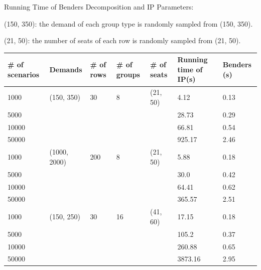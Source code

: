 \begin{frame}{Running Time of Benders Decomposition and IP}
  Parameters: 

  (150, 350): the demand of each group type is randomly sampled from (150, 350).

  (21, 50): the number of seats of each row is randomly sampled from (21, 50).
  \tiny
  \begin{table}[ht]
    \centering
    \begin{tabular}{|l|l|l|l|l|l|l|}
    \hline
    \# of scenarios & Demands & \# of rows & \# of groups & \# of seats & Running time of IP(s) & Benders (s) \\
    \hline
    1000  & (150, 350) & 30 & 8 & (21, 50) & 4.12  & 0.13 \\
    5000  &            &    &   &         & 28.73 & 0.29  \\
    10000 &            &    &   &         & 66.81  & 0.54 \\
    50000 &            &    &   &         & 925.17 & 2.46 \\
    \hline
    1000  & (1000, 2000) & 200 & 8 & (21, 50) & 5.88 & 0.18 \\
    5000  &              &     &   &          & 30.0 & 0.42 \\
    10000 &              &     &   &          & 64.41 & 0.62 \\
    50000 &              &     &   &          & 365.57 & 2.51\\
    \hline
    1000  & (150, 250) & 30 & 16 & (41, 60) & 17.15  & 0.18 \\
    5000  &            &    &    &          & 105.2  & 0.37 \\
    10000 &            &    &    &          & 260.88 & 0.65 \\
    50000 &            &    &    &          & 3873.16 & 2.95 \\
    \hline
    \end{tabular}
  \end{table}
\end{frame}

